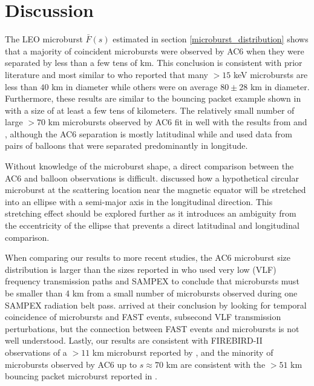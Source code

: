 \documentclass[draft]{agujournal2019}
\begin{document}
\section{Discussion} \label{discussion}
The LEO microburst $\bar{F}(s)$ estimated in section \ref{microburst_distribution} shows that a majority of coincident microbursts were observed by AC6 when they were separated by less than a few tens of km. This conclusion is consistent with prior literature and most similar to  who reported that many $> 15$ keV microbursts are less than $40$ km in diameter while others were on average $80 \pm 28$ km in diameter. Furthermore, these results are similar to the bouncing packet example shown in  with a size of at least a few tens of kilometers. The relatively small number of large $> 70$ km microbursts observed by AC6 fit in well with the results from  and , although the AC6 separation is mostly latitudinal while  and  used data from pairs of balloons that were separated predominantly in longitude. 

Without knowledge of the microburst shape, a direct comparison between the AC6 and balloon observations is difficult.  discussed how a hypothetical circular microburst at the scattering location near the magnetic equator will be stretched into an ellipse with a semi-major axis in the longitudinal direction. This stretching effect should be explored further as it introduces an ambiguity from the eccentricity of the ellipse that prevents a direct latitudinal and longitudinal comparison.

When comparing our results to more recent studies, the AC6 microburst size distribution is larger than the sizes reported in  who used very low (VLF) frequency transmission paths and SAMPEX to conclude that microbursts must be smaller than 4 km from a small number of microbursts observed during one SAMPEX radiation belt pass.  arrived at their conclusion by looking for temporal coincidence of microbursts and FAST events, subsecond VLF transmission perturbations, but the connection between FAST events and microbursts is not well understood. Lastly, our results are consistent with FIREBIRD-II observations of a $> 11$ km microburst reported by , and the minority of microbursts observed by AC6 up to $s \approx 70$ km are consistent with the $> 51$ km bouncing packet microburst reported in .
\end{document}
